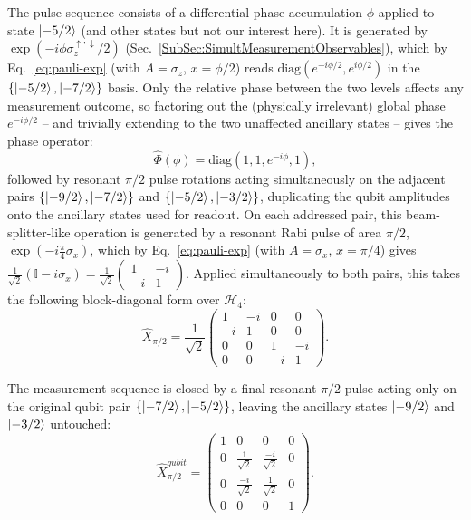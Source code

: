The pulse sequence consists of a differential phase accumulation $\phi$ applied to state $\ket{-5/2}$ (and other states but not our interest here). It is generated by $\exp(-i\phi\sigma_z^{\uparrow,\downarrow}/2)$ (Sec.~\ref{SubSec:SimultMeasurementObservables}), which by Eq.~\eqref{eq:pauli-exp} (with $A=\sigma_z$, $x=\phi/2$) reads $\mathrm{diag}(e^{-i\phi/2}, e^{i\phi/2})$ in the $\{\ket{-5/2},\ket{-7/2}\}$ basis. Only the relative phase between the two levels affects any measurement outcome, so factoring out the (physically irrelevant) global phase $e^{-i\phi/2}$ -- and trivially extending to the two unaffected ancillary states -- gives the phase operator:
\begin{equation}
    \hat{\Phi}(\phi) = \text{diag}\left(1, 1, e^{-i\phi}, 1\right),
\end{equation}
followed by resonant $\pi/2$ pulse rotations acting simultaneously on the adjacent pairs $\left\{\ket{-9/2}, \ket{-7/2}\right\}$ and $\left\{\ket{-5/2}, \ket{-3/2}\right\}$, duplicating the qubit amplitudes onto the ancillary states used for readout. On each addressed pair, this beam-splitter-like operation is generated by a resonant Rabi pulse of area $\pi/2$, $\exp(-i\frac{\pi}{4}\sigma_x)$, which by Eq.~\eqref{eq:pauli-exp} (with $A=\sigma_x$, $x=\pi/4$) gives $\frac{1}{\sqrt{2}}(\mathbb{I}-i\sigma_x) = \frac{1}{\sqrt2}\begin{pmatrix}1&-i\\-i&1\end{pmatrix}$. Applied simultaneously to both pairs, this takes the following block-diagonal form over $\mathcal{H}_4$:
\begin{equation}
    \hat{X}_{\pi/2} = \frac{1}{\sqrt{2}} \begin{pmatrix}
    1 & -i & 0 & 0 \\
    -i & 1 & 0 & 0 \\
    0 & 0 & 1 & -i \\
    0 & 0 & -i & 1
    \end{pmatrix}.
\end{equation}

The measurement sequence is closed by a final resonant $\pi/2$ pulse acting only on the original qubit pair $\left\{\ket{-7/2}, \ket{-5/2}\right\}$, leaving the ancillary states $\ket{-9/2}$ and $\ket{-3/2}$ untouched:
\begin{equation}
    \hat{X}^{qubit}_{\pi/2} = \begin{pmatrix}
    1 & 0 & 0 & 0 \\
    0 & \frac{1}{\sqrt{2}} & \frac{-i}{\sqrt{2}} & 0 \\
    0 & \frac{-i}{\sqrt{2}} & \frac{1}{\sqrt{2}} & 0 \\
    0 & 0 & 0 & 1
    \end{pmatrix}.
\end{equation}


